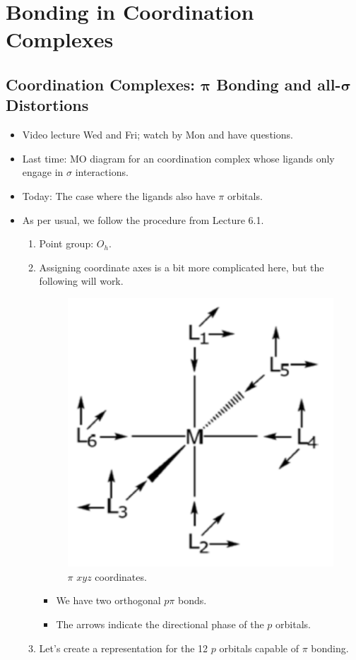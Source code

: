\documentclass[../notes.tex]{subfiles}
\begin{document}
\chapter{Bonding in Coordination Complexes}
\section[Coordination Complexes: \texorpdfstring{$\pi$}{TEXT} Bonding and all-\texorpdfstring{$\sigma$}{TEXT} Distortions]{Coordination Complexes: \texorpdfstring{$\bm{\pi}$}{TEXT} Bonding and all-\texorpdfstring{$\bm{\sigma}$}{TEXT} Distortions}
\begin{itemize}
    \item {}Video lecture Wed and Fri; watch by Mon and have questions.
    \item Last time: MO diagram for an  coordination complex whose ligands only engage in $\sigma$ interactions.
    \item Today: The case where the ligands also have $\pi$ orbitals.
    \item As per usual, we follow the procedure from Lecture 6.1.
    \begin{enumerate}
        \item Point group: $O_h$.
        \item Assigning coordinate axes is a bit more complicated here, but the following will work.
        \begin{figure}[h!]
            \centering
            \includegraphics[width=0.2\linewidth]{../ExtFiles/piOrientationsML6.png}
            \caption{ $\pi$ $xyz$ coordinates.}
            \label{fig:xyzML6pi}
        \end{figure}
        \begin{itemize}
            \item We have two orthogonal $p\pi$ bonds.
            \item The arrows indicate the directional phase of the $p$ orbitals.
        \end{itemize}
        \item Let's create a representation for the 12 $p$ orbitals capable of $\pi$ bonding.
        \begin{table}[h!]

\end{table}
\end{enumerate}
\end{itemize}
\end{document}

